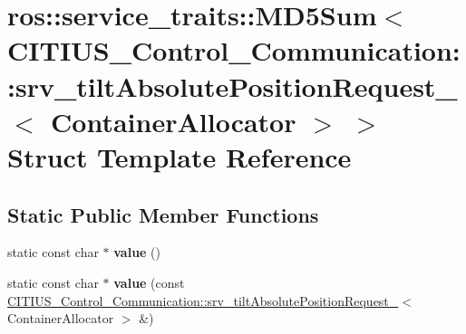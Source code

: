 \hypertarget{structros_1_1service__traits_1_1_m_d5_sum_3_01_c_i_t_i_u_s___control___communication_1_1srv__tila46beb5c31b07c7716741940663523e2}{\section{ros\-:\-:service\-\_\-traits\-:\-:\-M\-D5\-Sum$<$ \-C\-I\-T\-I\-U\-S\-\_\-\-Control\-\_\-\-Communication\-:\-:srv\-\_\-tilt\-Absolute\-Position\-Request\-\_\-$<$ \-Container\-Allocator $>$ $>$ \-Struct \-Template \-Reference}
\label{structros_1_1service__traits_1_1_m_d5_sum_3_01_c_i_t_i_u_s___control___communication_1_1srv__tila46beb5c31b07c7716741940663523e2}
}
\subsection*{\-Static \-Public \-Member \-Functions}
\begin{DoxyCompactItemize}
\item 
\hypertarget{structros_1_1service__traits_1_1_m_d5_sum_3_01_c_i_t_i_u_s___control___communication_1_1srv__tila46beb5c31b07c7716741940663523e2_a47da4f3a8f9a48badfb40a83c5bb4ae1}{static const char $\ast$ {\bfseries value} ()}\label{structros_1_1service__traits_1_1_m_d5_sum_3_01_c_i_t_i_u_s___control___communication_1_1srv__tila46beb5c31b07c7716741940663523e2_a47da4f3a8f9a48badfb40a83c5bb4ae1}

\item 
\hypertarget{structros_1_1service__traits_1_1_m_d5_sum_3_01_c_i_t_i_u_s___control___communication_1_1srv__tila46beb5c31b07c7716741940663523e2_a28dcf6df1fb7635cd0f1eaeef711dcf8}{static const char $\ast$ {\bfseries value} (const \hyperlink{struct_c_i_t_i_u_s___control___communication_1_1srv__tilt_absolute_position_request__}{\-C\-I\-T\-I\-U\-S\-\_\-\-Control\-\_\-\-Communication\-::srv\-\_\-tilt\-Absolute\-Position\-Request\-\_\-}$<$ \-Container\-Allocator $>$ \&)}\label{structros_1_1service__traits_1_1_m_d5_sum_3_01_c_i_t_i_u_s___control___communication_1_1srv__tila46beb5c31b07c7716741940663523e2_a28dcf6df1fb7635cd0f1eaeef711dcf8}

\end{DoxyCompactItemize}
